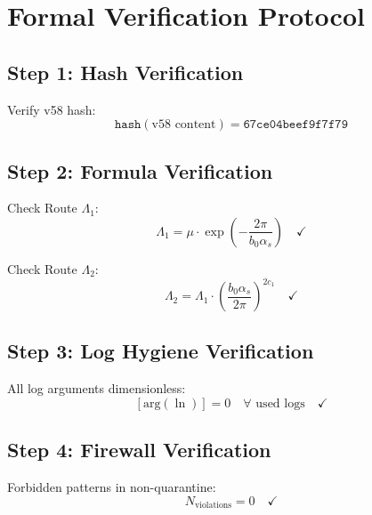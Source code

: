 \documentclass[11pt,a4paper]{article}
\theoremstyle{definition}
\begin{document}
\section{Formal Verification Protocol}
\label{app:verify-protocol}

\subsection{Step 1: Hash Verification}
\label{subsec:verify-hash}

Verify v58 hash:
\begin{equation}
\label{eq:app-verify-hash}
\texttt{hash}(\text{v58 content}) = \texttt{67ce04beef9f7f79}
\end{equation}

\subsection{Step 2: Formula Verification}
\label{subsec:verify-formula}

Check Route $\Lambda_1$:
\begin{equation}
\label{eq:app-verify-lambda1}
\Lambda_1 = \mu \cdot \exp\left(-\frac{2\pi}{b_0\alpha_s}\right) \quad \checkmark
\end{equation}

Check Route $\Lambda_2$:
\begin{equation}
\label{eq:app-verify-lambda2}
\Lambda_2 = \Lambda_1 \cdot \left(\frac{b_0\alpha_s}{2\pi}\right)^{2c_1} \quad \checkmark
\end{equation}

\subsection{Step 3: Log Hygiene Verification}
\label{subsec:verify-logs}

All log arguments dimensionless:
\begin{equation}
\label{eq:app-verify-log}
[\text{arg}(\ln)] = 0 \quad \forall \text{ used logs} \quad \checkmark
\end{equation}

\subsection{Step 4: Firewall Verification}
\label{subsec:verify-firewall}

Forbidden patterns in non-quarantine:
\begin{equation}
\label{eq:app-verify-firewall}
N_{\text{violations}} = 0 \quad \checkmark
\end{equation}
\end{document}
